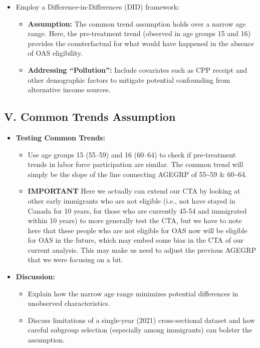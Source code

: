 \documentclass[
]{article}
\providecommand{\tightlist}{%
  \setlength{\itemsep}{0pt}\setlength{\parskip}{0pt}}
\begin{document}
\begin{itemize}
  \begin{itemize}
  \tightlist
  \item
    Employ a Difference-in-Differences (DID) framework:

    \begin{itemize}
    \tightlist
    \item
      \textbf{Assumption:} The common trend assumption holds over a
      narrow age range. Here, the pre-treatment trend (observed in age
      groups 15 and 16) provides the counterfactual for what would have
      happened in the absence of OAS eligibility.
    \item
      \textbf{Addressing ``Pollution'':} Include covariates such as CPP
      receipt and other demographic factors to mitigate potential
      confounding from alternative income sources.
    \end{itemize}
  \end{itemize}
\end{itemize}

\subsection{V. Common Trends
Assumption}\label{v.-common-trends-assumption}

\begin{itemize}
\tightlist
\item
  \textbf{Testing Common Trends:}

  \begin{itemize}
  \tightlist
  \item
    Use age groups 15 (55--59) and 16 (60--64) to check if pre-treatment
    trends in labor force participation are similar. The common trend
    will simply be the slope of the line connecting AGEGRP of
    55\textasciitilde59 \& 60\textasciitilde64.
  \item
    \textbf{IMPORTANT} Here we actually can extend our CTA by looking at
    other early immigrants who are not eligible (i.e., not have stayed
    in Canada for 10 years, for those who are currently 45-54 and
    immigrated within 10 years) to more generally test the CTA, but we
    have to note here that these people who are not eligible for OAS now
    will be eligible for OAS in the future, which may embed some bias in
    the CTA of our current analysis. This may make us need to adjust the
    previous AGEGRP that we were focusing on a bit.
  \end{itemize}
\item
  \textbf{Discussion:}

  \begin{itemize}
  \tightlist
  \item
    Explain how the narrow age range minimizes potential differences in
    unobserved characteristics.
  \item
    Discuss limitations of a single-year (2021) cross-sectional dataset
    and how careful subgroup selection (especially among immigrants) can
    bolster the assumption.
  \end{itemize}
\end{itemize}
\end{document}
